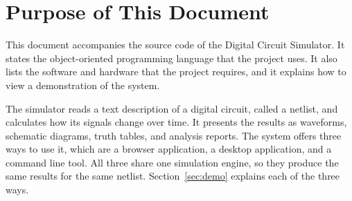 \section{Purpose of This Document}

This document accompanies the source code of the Digital Circuit Simulator.
It states the object-oriented programming language that the project uses.
It also lists the software and hardware that the project requires, and it explains how to view a demonstration of the system.

The simulator reads a text description of a digital circuit, called a netlist, and calculates how its signals change over time.
It presents the results as waveforms, schematic diagrams, truth tables, and analysis reports.
The system offers three ways to use it, which are a browser application, a desktop application, and a command line tool.
All three share one simulation engine, so they produce the same results for the same netlist.
Section~\ref{sec:demo} explains each of the three ways.
